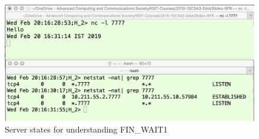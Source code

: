 \begin{figure}[!htb]
\centering
\includegraphics[scale=.25]{src/Figures/chap3/5.jpg}
\caption{Server states for understanding FIN\_WAIT1}\label{chap3-fig5}
\end{figure}

